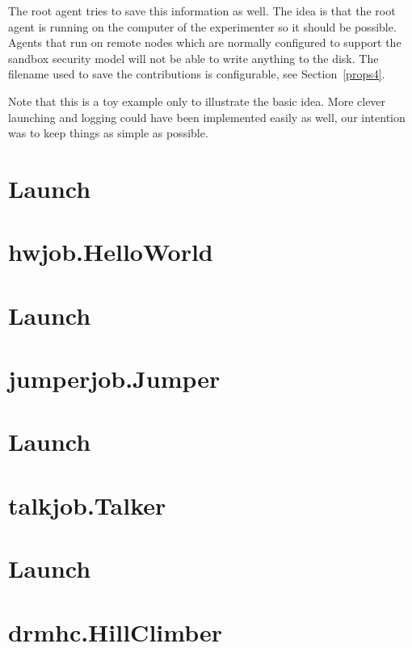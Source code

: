 \documentclass{article}
\begin{document}
The root agent tries to save this information as well.
The idea is that the root agent is running on the computer of the experimenter
so it should be possible.
Agents that run on remote nodes which are normally configured to support
the sandbox security model will not be able to write anything to the disk.
The filename used to save the contributions is configurable, see
Section~\ref{props4}.

Note that this is a toy example only to illustrate the basic idea.
More clever launching and logging could have been implemented easily as well,
our intention was to keep things as simple as possible.

\appendix


\begin{htmlonly}
\section{Launch}
\label{launch1}
\section{hwjob.HelloWorld}
\label{agent1}
\section{Launch}
\label{launch2}
\section{jumperjob.Jumper}
\label{agent2}
\section{Launch}
\label{launch3}
\section{talkjob.Talker}
\label{agent3}
\section{Launch}
\label{launch4}
\section{drmhc.HillClimber}
\label{agent4}

\end{htmlonly}
\end{document}
